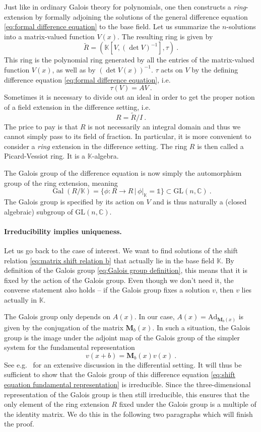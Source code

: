 \documentclass[12pt,a4paper]{article}
\newcommand{\be}{\begin{equation}}
\newcommand{\ee}{\end{equation}}
\newcommand\CC{\mathbb{C}}
\newcommand\KK{\mathbb{K}}
\newcommand\GL{\text{GL}}
\newcommand\Ad{\text{Ad}}
\newcommand\id{\mathds{1}}
\DeclareMathOperator\Gal{Gal}
\begin{document}
Just like in ordinary Galois theory for polynomials, one then constructs a \emph{ring}-extension by formally adjoining the solutions of the general difference equation \eqref{eq:formal difference equation} to the base field. Let us summarize the $n$-solutions into a matrix-valued function $V(x)$. The resulting ring is given by
\be 
\tilde{R}=(\KK[V,(\det V)^{-1}],\tau)\ .
\ee
This ring is the polynomial ring generated by all the entries of the matrix-valued function $V(x)$, as well as by $(\det V(x))^{-1}$. $\tau$ acts on $V$ by the defining difference equation \eqref{eq:formal difference equation}, i.e.
\be 
\tau(V)=AV\ .
\ee
Sometimes it is necessary to divide out an ideal in order to get the proper notion of a field extension in the difference setting, i.e.
\be 
R=\tilde{R}/I\ .
\ee
The price to pay is that $R$ is not necessarily an integral domain and thus we cannot simply pass to its field of fraction. In particular, it is more convenient to consider a \emph{ring} extension in the difference setting. The ring $R$ is then called a Picard-Vessiot ring. It is a $\KK$-algebra.

The Galois group of the difference equation is now simply the automorphism group of the ring extension, meaning
\be 
\Gal(R/\KK)=\{\phi:R \to R\, | \, \phi|_\KK=\id \} \subset \GL(n,\CC)\ . \label{eq:Galois group definition}
\ee
The Galois group is specified by its action on $V$ and is thus naturally a (closed algebraic) subgroup of $\GL(n,\CC)$.

\paragraph{Irreducibility implies uniqueness.} Let us go back to the case of interest. We want to find solutions of the shift relation \eqref{eq:matrix shift relation b} that actually lie in the base field $\KK$. By definition of the Galois group \eqref{eq:Galois group definition}, this means that it is fixed by the action of the Galois group. Even though we don't need it, the converse statement also holds -- if the Galois group fixes a solution $v$, then $v$ lies actually in $\KK$.

The Galois group only depends on $A(x)$. In our case, $A(x)=\Ad_{\mathbf{M}_b(x)}$ is given by the conjugation of the matrix $\mathbf{M}_b(x)$.  In such a situation, the Galois group is the image under the adjoint map of the Galois group of the simpler system for the fundamental representation
\be 
v(x+b)=\mathbf{M}_b(x) v(x)\ . \label{eq:shift equation fundamental representation}
\ee
See e.g.\ \cite{Van2012Galois} for an extensive discussion in the differential setting.
It will thus be sufficient to show that the Galois group of this difference equation \eqref{eq:shift equation fundamental representation} is irreducible. Since the three-dimensional representation of the Galois group is then still irreducible, this ensures that the only element of the ring extension $R$ fixed under the Galois group is a multiple of the identity matrix. We do this in the following two paragraphs which will finish the proof.
\end{document}
